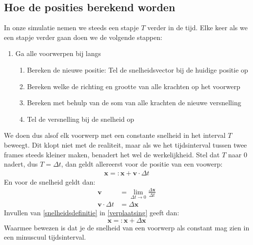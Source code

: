 \documentclass[12pt,a4paper]{article}
\begin{document}
	\subsection{Hoe de posities berekend worden}
	In onze simulatie nemen we steeds een stapje $T$ verder in de tijd. Elke keer als we een stapje verder gaan doen we de volgende stappen:
	\\
	\begin{enumerate}[1]
		\item Ga alle voorwerpen bij langs
		\begin{enumerate}[1]
			\item Bereken de nieuwe positie: Tel de snelheidsvector bij de huidige positie op
			\item Bereken welke de richting en grootte van alle krachten op het voorwerp
			\item Bereken met behulp van de som van alle krachten de nieuwe versnelling
			\item Tel de versnelling bij de snelheid op
		\end{enumerate}
	\end{enumerate}
	We doen dus alsof elk voorwerp met een constante snelheid in het interval $T$ beweegt. Dit klopt niet met de realiteit, maar als we het tijdsinterval tussen twee frames steeds kleiner maken, benadert het wel de werkelijkheid. Stel dat $T$ naar 0 nadert, dus $T = \Delta t$, dan geldt allereerst voor de positie van een voowerp:
	\\	
	\begin{equation}
		\label{verplaatsing}
		\begin{aligned}
			\mathbf{x} =: \mathbf{x} + \mathbf{v} \cdot \Delta t
		\end{aligned}	
	\end{equation}
	En voor de snelheid geldt dan:
	\\	
	\begin{equation}
		\label{snelheidsdefinitie}
		\begin{aligned}
			\mathbf{v} &= \lim_{\Delta t\to0} \frac{\Delta \mathbf{x}}{\Delta t} \\
			\mathbf{v} \cdot \Delta t &= \Delta \mathbf{x}
		\end{aligned}
	\end{equation}
	Invullen van \eqref{snelheidsdefinitie} in \eqref{verplaatsing} geeft dan:
	\begin{equation}
		\mathbf{x} =: \mathbf{x} +  \Delta \mathbf{x}
	\end{equation}
	Waarmee bewezen is dat je de snelheid van een voorwerp als constant mag zien in een minuscuul tijdsinterval.
\end{document}
